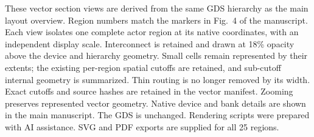 These vector section views are derived from the same GDS hierarchy as the main layout overview. Region numbers match the markers in Fig.~4 of the manuscript. Each view isolates one complete actor region at its native coordinates, with an independent display scale. Interconnect is retained and drawn at 18\% opacity above the device and hierarchy geometry. Small cells remain represented by their extents; the existing per-region spatial cutoffs are retained, and sub-cutoff internal geometry is summarized. Thin routing is no longer removed by its width. Exact cutoffs and source hashes are retained in the vector manifest. Zooming preserves represented vector geometry. Native device and bank details are shown in the main manuscript. The GDS is unchanged. Rendering scripts were prepared with AI assistance. SVG and PDF exports are supplied for all 25 regions.

